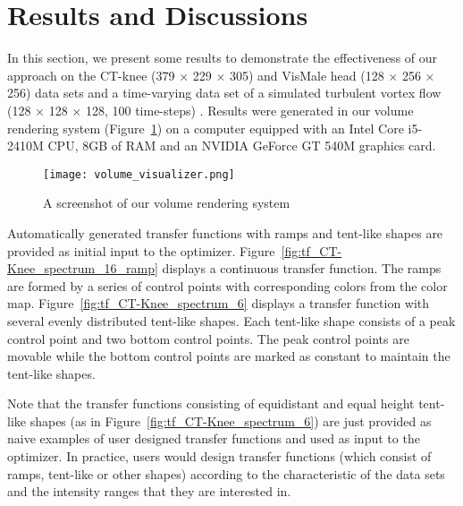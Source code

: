 \section{Results and Discussions}
In this section, we present some results to demonstrate the effectiveness of our approach on the CT-knee (379 $ \times $ 229 $ \times $ 305) and VisMale head (128 $ \times $ 256 $ \times $ 256) data sets \cite{website:Roettger_volume_2013} and a time-varying data set of a simulated turbulent vortex flow (128 $\times$ 128 $\times$ 128, 100 time-steps) \cite{ma_high_2000}.
Results were generated in our volume rendering system (Figure~\ref{fig:volume_visualizer}) on a computer equipped with an Intel Core i5-2410M CPU, 8GB of RAM and an NVIDIA GeForce GT 540M graphics card.

\begin{figure}
    \centering
	\begin{minipage}{.9\textwidth}
        \centering
        \texttt{[image: volume\_visualizer.png]}
        \caption{A screenshot of our volume rendering system}
        \label{fig:volume_visualizer}
	\end{minipage}
\end{figure}

Automatically generated transfer functions with ramps and tent-like shapes are provided as initial input to the optimizer. Figure~\ref{fig:tf_CT-Knee_spectrum_16_ramp} displays a continuous transfer function. The ramps are formed by a series of control points with corresponding colors from the color map.
Figure~\ref{fig:tf_CT-Knee_spectrum_6} displays a transfer function with several evenly distributed tent-like shapes. Each tent-like shape consists of a peak control point and two bottom control points. The peak control points are movable while the bottom control points are marked as constant to maintain the tent-like shapes.

Note that the transfer functions consisting of equidistant and equal height tent-like shapes (as in Figure~\ref{fig:tf_CT-Knee_spectrum_6}) are just provided as naive examples of user designed transfer functions and used as input to the optimizer. In practice, users would design transfer functions (which consist of ramps, tent-like or other shapes) according to the characteristic of the data sets and the intensity ranges that they are interested in.

